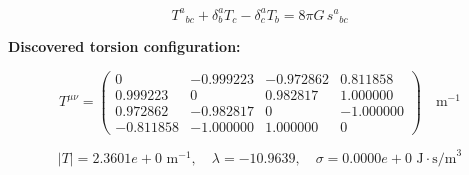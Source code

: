 
\begin{equation}
  T^a{}_{bc} + \delta^a_b T_c - \delta^a_c T_b = 8\pi G \, s^a{}_{bc}
\end{equation}

\textbf{Discovered torsion configuration:}

\begin{equation}
  T^{\mu\nu} = \begin{pmatrix}
    0 & -0.999223 & -0.972862 & 0.811858 \\
    0.999223 & 0 & 0.982817 & 1.000000 \\
    0.972862 & -0.982817 & 0 & -1.000000 \\
    -0.811858 & -1.000000 & 1.000000 & 0
  \end{pmatrix} \quad \text{m}^{-1}
\end{equation}

\begin{equation}
  |T| = 2.3601e+0 \text{ m}^{-1}, \quad
  \lambda = -10.9639, \quad
  \sigma = 0.0000e+0 \text{ J}\cdot\text{s/m}^3
\end{equation}